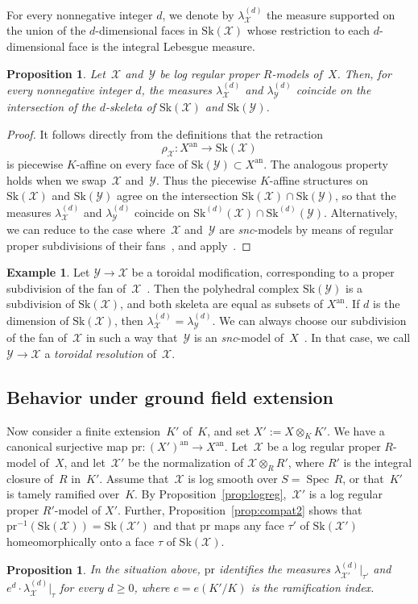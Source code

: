 \documentclass[11pt]{article}
\newtheorem{prop}[equation]{Proposition}
\theoremstyle{definition}
\newtheorem{example}[equation]{Example}
\numberwithin{equation}{subsection}
\newcommand{\cX}{\ensuremath{\mathscr{X}}}
\newcommand{\cY}{\ensuremath{\mathscr{Y}}}
\newcommand{\snc}{\textit{snc}}
\newcommand{\an}{\mathrm{an}}
\newcommand{\pr}{\mathrm{pr}}
\newcommand{\Sk}{\mathrm{Sk}}
\DeclareMathOperator{\Spec}{Spec}
\let\Leb\lambda
\begin{document}
For every nonnegative integer $d$, we denote by $\Leb^{(d)}_{\cX}$ the measure supported on the union of the $d$-dimensional faces in $\Sk(\cX)$ whose restriction
to each $d$-dimensional face is the integral Lebesgue measure.

\begin{prop}\label{prop:compat3}
Let~$\cX$ and~$\cY$ be log regular proper $R$\nobreakdash-models of~$X$.
Then, for every nonnegative integer $d$, the measures $\Leb^{(d)}_{\cX}$ and $\Leb^{(d)}_{\cY}$ coincide on the intersection of the $d$\nobreakdash-skeleta of $\Sk(\cX)$ and $\Sk(\cY)$.
\end{prop}

\begin{proof}
It follows directly from the definitions that the retraction
\[
\rho_{\cX}\colon X^{\an}\to \Sk(\cX)
\]
is piecewise $K$\nobreakdash-affine
on every face of $\Sk(\cY)\subset X^{\an}$. The analogous property holds when we swap~$\cX$ and~$\cY$. Thus the piecewise $K$\nobreakdash-affine structures on $\Sk(\cX)$ and $\Sk(\cY)$ agree on the intersection $\Sk(\cX)\cap \Sk(\cY)$, so that the measures $\Leb_{\cX}^{(d)}$ and $\Leb_{\cY}^{(d)}$ coincide on $\Sk^{(d)}(\cX)\cap \Sk^{(d)}(\cY)$. Alternatively, we can reduce to the case where~$\cX$ and~$\cY$ are \snc-models by means of regular proper subdivisions of their fans~\cite[10.4]{kato}, and apply~\cite[3.2.4]{MuNi}.
\end{proof}
\begin{example}\label{exam:torres}
Let $\cY\to \cX$ be a toroidal modification, corresponding to a proper subdivision of the fan of~$\cX$~\cite[\S9]{kato}.
Then the polyhedral complex $\Sk(\cY)$ is a subdivision of $\Sk(\cX)$, and both skeleta are equal as subsets of $X^{\an}$.
If $d$ is the dimension of $\Sk(\cX)$, then $\Leb^{(d)}_{\cX}=\Leb^{(d)}_{\cY}$. We can always choose our subdivision of the fan of~$\cX$ in such a way that~$\cY$ is an \snc-model of~$X$~\cite[10.4]{kato}. In that case, we call $\cY\to \cX$ a {\em toroidal resolution} of~$\cX$.
\end{example}
\subsection{Behavior under ground field extension}
Now consider a finite extension~$K'$ of~$K$, and set $X':=X\otimes_KK'$.
We have a canonical surjective map $\pr\colon (X')^{\an}\to X^{\an}$.
Let~$\cX$ be a log regular proper $R$\nobreakdash-model of~$X$, and let~$\cX'$ be the normalization of $\cX\otimes_R R'$, where $R'$ is the integral closure of~$R$ in~$K'$.
Assume that~$\cX$ is log smooth over $S=\Spec\,R$, or that~$K'$ is tamely ramified over~$K$.
By Proposition~\ref{prop:logreg},~$\cX'$ is a log regular proper $R'$-model of $X'$. Further, Proposition~\ref{prop:compat2} shows that $\pr^{-1}(\Sk(\cX))=\Sk(\cX')$
and that $\pr$ maps any face $\tau'$ of $\Sk(\cX')$ homeomorphically onto a face $\tau$ of $\Sk(\cX)$.
\begin{prop}\label{prop:compat4}
In the situation above, $\pr$ identifies the measures $\Leb^{(d)}_{\cX'}|_{\tau'}$
and $e^d\cdot \Leb^{(d)}_{\cX}|_{\tau}$ for every $d\geq 0$,
where $e=e(K'/K)$ is the ramification index.
\end{prop}
\end{document}
